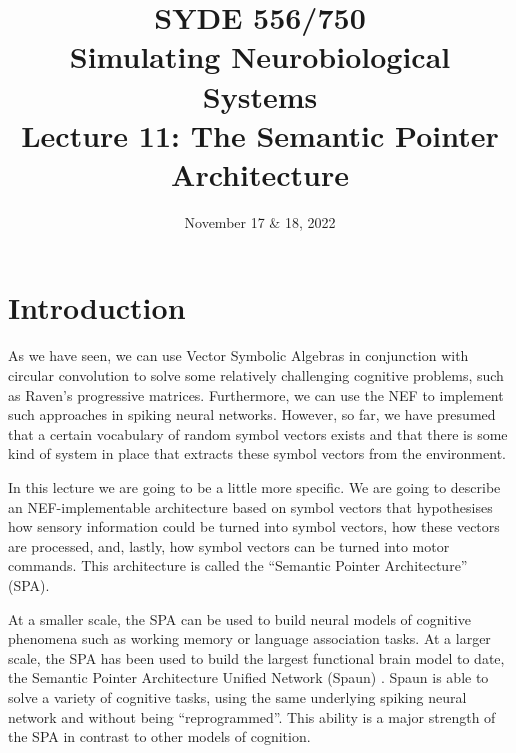 \documentclass[10pt,letterpaper,oneside]{article}
\date{November 17 \& 18, 2022}
\title{SYDE 556/750 \\ Simulating Neurobiological Systems \\ Lecture 11: The Semantic Pointer Architecture}
\begin{document}

\section{Introduction}


As we have seen, we can use Vector Symbolic Algebras in conjunction with circular convolution to solve some relatively challenging cognitive problems, such as Raven's progressive matrices. Furthermore, we can use the NEF to implement such approaches in spiking neural networks. However, so far, we have presumed that a certain vocabulary of random symbol vectors exists and that there is some kind of system in place that extracts these symbol vectors from the environment.

In this lecture we are going to be a little more specific. We are going to describe an NEF-implementable architecture based on symbol vectors that hypothesises how sensory information could be turned into symbol vectors, how these vectors are processed, and, lastly, how symbol vectors can be turned into motor commands. This architecture is called the \enquote{Semantic Pointer Architecture} (SPA).

At a smaller scale, the SPA can be used to build neural models of cognitive phenomena such as working memory or language association tasks. At a larger scale, the SPA has been used to build the largest functional brain model to date, the Semantic Pointer Architecture Unified Network (Spaun) \cite{eliasmith2012largescale,choo2018spaun}. Spaun is able to solve a variety of cognitive tasks, using the same underlying spiking neural network and without being \enquote{reprogrammed}. This ability is a major strength of the SPA in contrast to other models of cognition.
\end{document}
